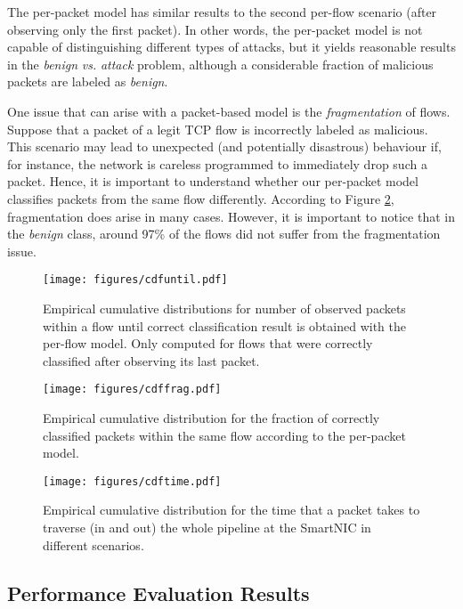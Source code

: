The per-packet model has similar results to the second per-flow scenario (after observing only the first packet). In other words, the per-packet model is not capable of distinguishing different types of attacks, but it yields reasonable results in the \emph{benign} \emph{vs.} \emph{attack} problem, although a considerable fraction of malicious packets are labeled as \emph{benign}.

One issue that can arise with a packet-based model is the \emph{fragmentation} of flows. Suppose that a packet of a legit TCP flow is incorrectly labeled as malicious. This scenario may lead to unexpected (and potentially disastrous) behaviour if, for instance, the network is careless programmed to immediately drop such a packet.
Hence, it is important to understand whether our per-packet model classifies packets from the same flow differently. According to Figure \ref{fig:packetclassres}, fragmentation does arise in many cases. However, it is important to notice that in the \emph{benign} class, around 97\% of the flows did not suffer from the fragmentation issue.

\begin{center}
\begin{figure}[t]
    \centering
    \texttt{[image: figures/cdfuntil.pdf]}
    \caption{Empirical cumulative distributions for number of observed packets within a flow until correct classification result is obtained with the per-flow model. Only computed for flows that were correctly classified after observing its last packet.}
    \label{fig:flowuntil}
\end{figure}
\begin{figure}[t]
    \centering
    \texttt{[image: figures/cdffrag.pdf]}
    \caption{Empirical cumulative distribution for the fraction of correctly classified packets within the same flow according to the per-packet model.}
    \label{fig:packetclassres}
\end{figure}
\begin{figure}[t]
    \centering
    \texttt{[image: figures/cdftime.pdf]}
    \caption{Empirical cumulative distribution for the time that a packet takes to traverse (in and out) the whole pipeline at the SmartNIC in different scenarios.}
    \label{fig:cdftime}
\end{figure}
\end{center}




\subsection{Performance Evaluation Results}\label{sub:latency}

